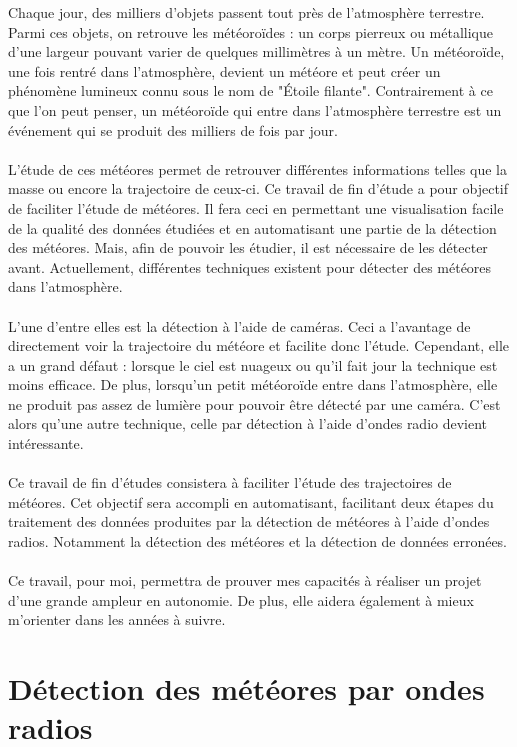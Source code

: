 \documentclass[11pt]{article}
\begin{document}
Chaque jour, des milliers d'objets passent tout près de l'atmosphère terrestre.
Parmi ces objets, on retrouve les météoroïdes : un corps pierreux ou métallique d'une largeur pouvant varier de quelques millimètres à un mètre.
Un météoroïde, une fois rentré dans l'atmosphère, devient un météore et peut créer un phénomène lumineux connu sous le nom de "Étoile filante".
Contrairement à ce que l'on peut penser, un météoroïde qui entre dans l'atmosphère terrestre est un événement qui se produit des milliers de fois par jour.
\\
\\
L'étude de ces météores permet de retrouver différentes informations telles que la masse ou encore la trajectoire de ceux-ci.
Ce travail de fin d'étude a pour objectif de faciliter l'étude de météores.
Il fera ceci en permettant une visualisation facile de la qualité des données étudiées et en automatisant une partie de la détection des météores.
Mais, afin de pouvoir les étudier, il est nécessaire de les détecter avant.
Actuellement, différentes techniques existent pour détecter des météores dans l'atmosphère.
\\
\\
L'une d'entre elles est la détection à l'aide de caméras.
Ceci a l'avantage de directement voir la trajectoire du météore et facilite donc l'étude.
Cependant, elle a un grand défaut : lorsque le ciel est nuageux ou qu'il fait jour la technique est moins efficace.
De plus, lorsqu'un petit météoroïde entre dans l'atmosphère, elle ne produit pas assez de lumière pour pouvoir être détecté par une caméra.
C'est alors qu'une autre technique, celle par détection à l'aide d'ondes radio devient intéressante.
\\
\\
Ce travail de fin d'études consistera à faciliter l'étude des trajectoires de météores.
Cet objectif sera accompli en automatisant, facilitant deux étapes du traitement des données produites par la détection de météores à l'aide d'ondes radios.
Notamment la détection des météores et la détection de données erronées.\\
\\
Ce travail, pour moi, permettra de prouver mes capacités à réaliser un projet d'une grande ampleur en autonomie.
De plus, elle aidera également à mieux m'orienter dans les années à suivre.

\newpage

\section{Détection des météores par ondes radios}
\end{document}
